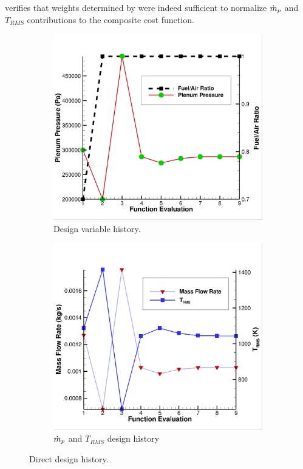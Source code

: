  verifies that weights determined by
 were indeed sufficient to normalize $\dot{m}_p$ and
$T_{RMS}$ contributions to the composite cost function.
\begin{figure}[h]
  \centering
	\begin{subfigure}[b]{0.4\textwidth}
    \centering
    \includegraphics[width=\textwidth]{figures/direct_design/dv-hist.png}
    \caption{Design variable history.}
    \label{fig:dd-dv-hist}
  \end{subfigure}
	\begin{subfigure}[b]{0.4\textwidth}
    \centering
    \includegraphics[width=\textwidth]{figures/direct_design/mass-tt.png}
    \caption{$\dot{m}_p$ and $T_{RMS}$ design history}
    \label{fig:dd-mass-tt}
  \end{subfigure}
  \caption{Direct design history.}
  \label{fig:dd-history}
\end{figure}
